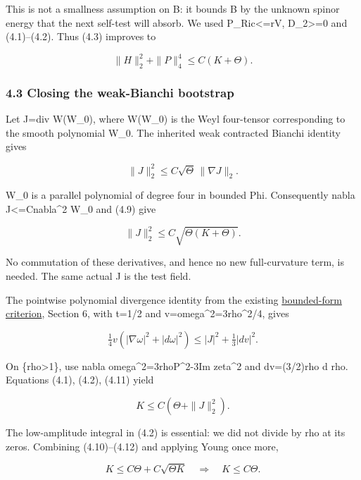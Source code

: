 \documentclass[
  10pt,
]{article}
\begin{document}
This is not a smallness assumption on B: it bounds B by the unknown
spinor energy that the next self-test will absorb. We used
P\_Ric\textless=rV, D\_2\textgreater=0 and (4.1)--(4.2). Thus (4.3)
improves to

\[
             \|H\|_2^2+\|P\|_4^4\le C(K+\Theta).   \tag{4.9}
\]

\hypertarget{closing-the-weak-bianchi-bootstrap}{%
\subsubsection{4.3 Closing the weak-Bianchi
bootstrap}\label{closing-the-weak-bianchi-bootstrap}}

Let J=div W(W\_0), where W(W\_0) is the Weyl four-tensor corresponding
to the smooth polynomial W\_0. The inherited weak contracted Bianchi
identity gives

\[
 \|J\|_2^2\le C\sqrt\Theta\,\|\nabla J\|_2.
\]

W\_0 is a parallel polynomial of degree four in bounded Phi.
Consequently \textbar nabla J\textbar\textless=C\textbar nabla\^{}2
W\_0\textbar{} and (4.9) give

\[
                    \|J\|_2^2\le C\sqrt{\Theta(K+\Theta)}.
                                                               \tag{4.10}
\]

No commutation of these derivatives, and hence no new full-curvature
term, is needed. The same actual J is the test field.

The pointwise polynomial divergence identity from the existing
\href{../mathematics/current/round21_analytic.md}{bounded-form
criterion}, Section 6, with t=1/2 and
v=\textbar omega\textbar\^{}2=3rho\^{}2/4, gives

\[
 \tfrac14 v(|\nabla\omega|^2+|d\omega|^2)
       \le |J|^2+\tfrac13|dv|^2.                     \tag{4.11}
\]

On \{rho\textgreater1\}, use \textbar nabla
omega\textbar\^{}2=3rho\textbar P\textbar\^{}2-3\textbar Im
zeta\textbar\^{}2 and dv=(3/2)rho d rho. Equations (4.1), (4.2), (4.11)
yield

\[
                       K\le C(\Theta+\|J\|_2^2).    \tag{4.12}
\]

The low-amplitude integral in (4.2) is essential: we did not divide by
rho at its zeros. Combining (4.10)--(4.12) and applying Young once more,

\[
 K\le C\Theta+C\sqrt{\Theta K}\quad\Longrightarrow\quad
                         \boxed{K\le C\Theta.}       \tag{4.13}
\]
\end{document}
